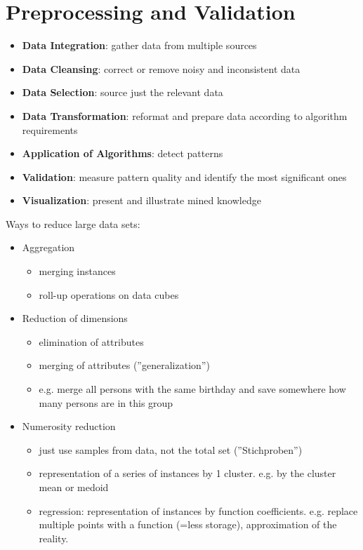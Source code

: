 
\section{Preprocessing and Validation}

\begin{breakbox}

\begin{itemize}
	\item \textbf{Data Integration}: gather data from multiple sources
	\item \textbf{Data Cleansing}: correct or remove noisy and inconsistent data
	\item \textbf{Data Selection}: source just the relevant data
	\item \textbf{Data Transformation}: reformat and prepare data according to algorithm requirements
	\item \textbf{Application of Algorithms}: detect patterns
	\item \textbf{Validation}: measure pattern quality and identify the most significant ones
	\item \textbf{Visualization}: present and illustrate mined knowledge
\end{itemize}
\end{breakbox}

\begin{breakbox}

Ways to reduce large data sets:

\begin{itemize}
	\item Aggregation
		\begin{itemize}
			\item merging instances
			\item roll-up operations on data cubes
		\end{itemize}
	\item Reduction of dimensions
		\begin{itemize}
			\item elimination of attributes
			\item merging of attributes (''generalization'')
			\item e.g. merge all persons with the same birthday and save somewhere how many persons are in this group 
		\end{itemize}
	\item Numerosity reduction
		\begin{itemize}
			\item just use samples from data, not the total set (''Stichproben'')
			\item representation of a series of instances by 1 cluster. e.g. by the cluster mean or medoid
			\item regression: representation of instances by function coefficients. e.g. replace multiple points with a function (=less storage), approximation of the reality.
		\end{itemize}
\end{itemize}
\end{breakbox}

